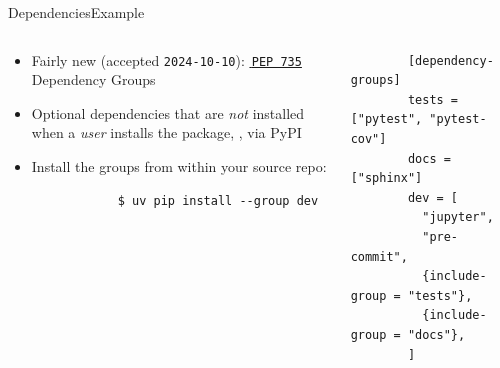 \begin{splitframe}[fragile]{Dependencies}{Example}
  \vspace{1em}
  \begin{columns}[t,onlytextwidth]
    \begin{column}{0.58\textwidth}
      \begin{itemize}
        \setlength{\itemsep}{1em}
        \item Fairly new (accepted \texttt{2024-10-10}): \href{https://peps.python.org/pep-0735/}{{\footnotesize{\faExternalLink*}}\,\texttt{PEP 735}} Dependency Groups
        \item Optional dependencies that are \emph{not} installed when a \emph{user} installs the package, \eg, via PyPI
        \item Install the groups from within your source repo:
          \begin{verbatim}
            $ uv pip install --group dev
          \end{verbatim}
      \end{itemize}
    \end{column}
    \hfill
    \begin{column}{0.38\textwidth}
      \begin{verbatim}
        [dependency-groups]
        tests = ["pytest", "pytest-cov"]
        docs = ["sphinx"]
        dev = [
          "jupyter",
          "pre-commit",
          {include-group = "tests"},
          {include-group = "docs"},
        ]
      \end{verbatim}
    \end{column}
  \end{columns}
\end{splitframe}

